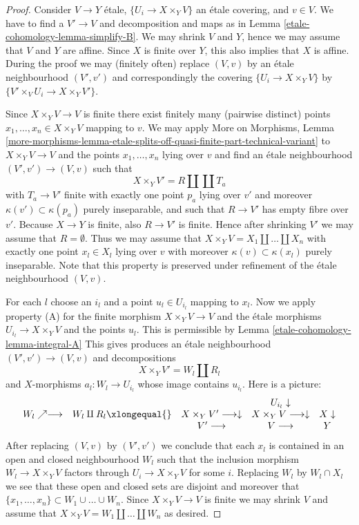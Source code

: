 \begin{proof}
Consider $V \to Y$ \'etale, $\{U_i \to X \times_Y V\}$ an \'etale covering, and
$v \in V$. We have to find a $V' \to V$ and decomposition and maps as in
Lemma \ref{etale-cohomology-lemma-simplify-B}.
We may shrink $V$ and $Y$, hence we may assume that $V$ and $Y$ are affine.
Since $X$ is finite over $Y$, this also implies that $X$ is affine.
During the proof we may (finitely often) replace $(V, v)$ by an
\'etale neighbourhood $(V', v')$ and correspondingly the covering
$\{U_i \to X \times_Y V\}$ by $\{V' \times_V U_i \to X \times_Y V'\}$.

\medskip\noindent
Since $X \times_Y V \to V$ is finite there exist finitely
many (pairwise distinct) points $x_1, \ldots, x_n \in X \times_Y V$
mapping to $v$. We may apply
More on Morphisms, Lemma
\ref{more-morphisms-lemma-etale-splits-off-quasi-finite-part-technical-variant}
to $X \times_Y V \to V$ and the points $x_1, \ldots, x_n$ lying over
$v$ and find an \'etale neighbourhood $(V', v') \to (V, v)$
such that
$$
X \times_Y V' = R \amalg \coprod T_a
$$
with $T_a \to V'$ finite with exactly one point $p_a$ lying over $v'$
and moreover $\kappa(v') \subset \kappa(p_a)$ purely inseparable, and
such that $R \to V'$ has empty fibre over $v'$.
Because $X \to Y$ is finite, also $R \to V'$ is finite. Hence after
shrinking $V'$ we may assume that $R = \emptyset$. Thus we may
assume that $X \times_Y V = X_1 \amalg \ldots \amalg X_n$ with
exactly one point $x_l \in X_l$ lying over $v$ with moreover
$\kappa(v) \subset \kappa(x_l)$ purely inseparable. Note that this
property is preserved under refinement of the \'etale neighbourhood
$(V, v)$.

\medskip\noindent
For each $l$ choose an $i_l$ and a point $u_l \in U_{i_l}$ mapping to $x_l$.
Now we apply property (A) for the finite morphism
$X \times_Y V \to V$ and the \'etale
morphisms $U_{i_l} \to X \times_Y V$ and the points $u_l$.
This is permissible by
Lemma \ref{etale-cohomology-lemma-integral-A}
This gives produces an \'etale neighbourhood $(V', v') \to (V, v)$
and decompositions
$$
X \times_Y V' = W_l \amalg R_l
$$
and $X$-morphisms $a_l : W_l \to U_{i_l}$ whose image contains $u_{i_l}$.
Here is a picture:
$$
\begin{array}{ccccc} &  &  & U_{i_l} \downarrow &  \\ W_l \nearrow\longrightarrow & W_l \amalg R_l \xlongequal{} & X \times_Y V' \longrightarrow\downarrow & X \times_Y V \longrightarrow\downarrow & X \downarrow \\  &  & V' \longrightarrow & V \longrightarrow & Y\end{array}
$$
After replacing $(V, v)$ by $(V', v')$ we conclude that each
$x_l$ is contained in an open and closed neighbourhood $W_l$ such that
the inclusion morphism $W_l \to X \times_Y V$ factors through
$U_i \to X \times_Y V$ for some $i$. Replacing $W_l$ by $W_l \cap X_l$
we see that these open and closed sets are disjoint and moreover
that $\{x_1, \ldots, x_n\} \subset W_1 \cup \ldots \cup W_n$.
Since $X \times_Y V \to V$ is finite we may shrink $V$ and assume that
$X \times_Y V = W_1 \amalg \ldots \amalg W_n$ as desired.
\end{proof}

